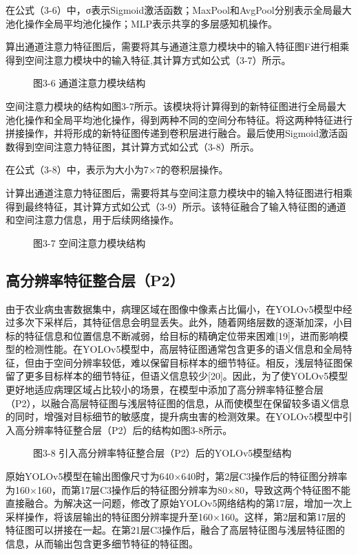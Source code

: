 \documentclass[12pt, a4paper, twoside]{ctexart}
\begin{document}
在公式（3-6）中，σ表示Sigmoid激活函数；MaxPool和AvgPool分别表示全局最大池化操作全局平均池化操作；MLP表示共享的多层感知机操作。

算出通道注意力特征图后，需要将其与通道注意力模块中的输入特征图F进行相乘得到空间注意力模块中的输入特征,其计算方式如公式（3-7）所示。


\begin{figure}[htbp]
\centering
\caption{图3-6 通道注意力模块结构}
\end{figure}

空间注意力模块的结构如图3-7所示。该模块将计算得到的新特征图进行全局最大池化操作和全局平均池化操作，得到两种不同的空间分布特征。将这两种特征进行拼接操作，并将形成的新特征图传递到卷积层进行融合。最后使用Sigmoid激活函数得到空间注意力特征图，其计算方式如公式（3-8）所示。

在公式（3-8）中，表示为大小为7×7的卷积层操作。

计算出通道注意力特征图后，需要将其与空间注意力模块中的输入特征图进行相乘得到最终特征，其计算方式如公式（3-9）所示。该特征融合了输入特征图的通道和空间注意力信息，用于后续网络操作。


\begin{figure}[htbp]
\centering
\caption{图3-7 空间注意力模块结构}
\end{figure}


\subsection{高分辨率特征整合层（P2）}

由于农业病虫害数据集中，病理区域在图像中像素占比偏小，在YOLOv5模型中经过多次下采样后，其特征信息会明显丢失。此外，随着网络层数的逐渐加深，小目标的特征信息和位置信息不断减弱，给目标的精确定位带来困难[19]，进而影响模型的检测性能。在YOLOv5模型中，高层特征图通常包含更多的语义信息和全局特征，但由于空间分辨率较低，难以保留目标样本的细节特征。相反，浅层特征图保留了更多目标样本的细节特征，但语义信息较少[20]。因此，为了使YOLOv5模型更好地适应病理区域占比较小的场景，在模型中添加了高分辨率特征整合层（P2），以融合高层特征图与浅层特征图的信息，从而使模型在保留较多语义信息的同时，增强对目标细节的敏感度，提升病虫害的检测效果。在YOLOv5模型中引入高分辨率特征整合层（P2）后的结构如图3-8所示。


\begin{figure}[htbp]
\centering
\caption{图3-8 引入高分辨率特征整合层（P2）后的YOLOv5模型结构}
\end{figure}

原始YOLOv5模型在输出图像尺寸为640×640时，第2层C3操作后的特征图分辨率为160×160，而第17层C3操作后的特征图分辨率为80×80，导致这两个特征图不能直接融合。为解决这一问题，修改了原始YOLOv5网络结构的第17层，增加一次上采样操作，将该层输出的特征图分辨率提升至160×160。这样，第2层和第17层的特征图可以拼接在一起。在第21层C3操作后，融合了高层特征图与浅层特征图的信息，从而输出包含更多细节特征的特征图。
\end{document}
